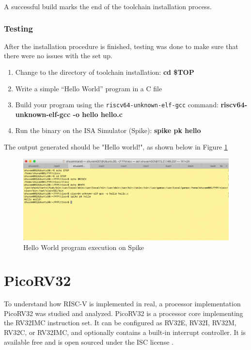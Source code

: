 A successful build marks the end of the toolchain installation process.

\subsubsection{Testing}
\label{sect6_2_2_2}
After the installation procedure is finished, testing was done to make sure that there were no issues with the set up. 
\begin{enumerate}
\item Change to the directory of toolchain installation:\newline
\small \textbf{cd \$TOP}
\item Write a simple “Hello World” program in a C file
\item Build your program using the \verb|riscv64-unknown-elf-gcc| command:\newline
\small \textbf{riscv64-unknown-elf-gcc -o hello hello.c}
\item Run the binary on the ISA Simulator (Spike):\newline
\small \textbf{spike pk hello}
\end{enumerate}

The output generated should be "Hello world!", as shown below in Figure \ref{fig:riscv3} \newline

\begin{figure}[h!]
\centering
\includegraphics[width=\linewidth]{figures/Spike_Output.png}
\caption{Hello World program execution on Spike}
\label{fig:riscv3}
\end{figure}

 \section{PicoRV32}
  \label{sect6_3}
To understand how RISC-V is implemented in real, a processor implementation PicoRV32 was studied and analyzed. PicoRV32 is a processor core implementing the RV32IMC instruction set. It can be configured as RV32E, RV32I, RV32M, RV32C, or RV32IMC, and optionally contains a built-in interrupt controller. It is available free and is open sourced under the ISC license \cite{picorv32}. 

